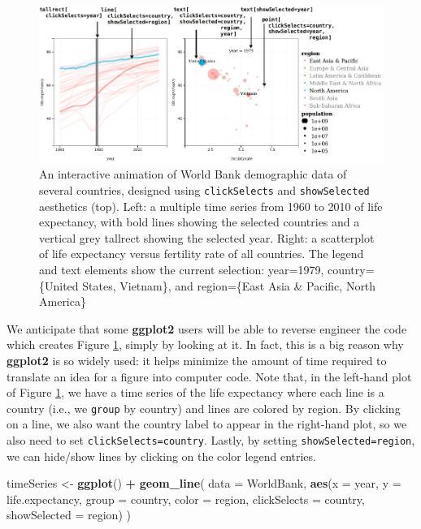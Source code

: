 \documentclass[12pt,]{article}
\newenvironment{Shaded}{\begin{snugshade}}{\end{snugshade}}
\newcommand{\DataTypeTok}[1]{\textcolor[rgb]{0.13,0.29,0.53}{#1}}
\newcommand{\KeywordTok}[1]{\textcolor[rgb]{0.13,0.29,0.53}{\textbf{#1}}}
\newcommand{\NormalTok}[1]{#1}
\newcommand{\OperatorTok}[1]{\textcolor[rgb]{0.81,0.36,0.00}{\textbf{#1}}}
\newcommand{\StringTok}[1]{\textcolor[rgb]{0.31,0.60,0.02}{#1}}
\theoremstyle{definition}
\theoremstyle{definition}
\theoremstyle{definition}
\theoremstyle{remark}
\begin{document}
\begin{figure}
\centering
\includegraphics{images/figure-1}
\caption{\label{fig:worldbank}An interactive animation of World Bank
demographic data of several countries, designed using
\texttt{clickSelects} and \texttt{showSelected} aesthetics (top). Left:
a multiple time series from 1960 to 2010 of life expectancy, with bold
lines showing the selected countries and a vertical grey tallrect
showing the selected year. Right: a scatterplot of life expectancy
versus fertility rate of all countries. The legend and text elements
show the current selection: year=1979, country=\{United States,
Vietnam\}, and region=\{East Asia \& Pacific, North America\}}
\end{figure}

We anticipate that some \textbf{ggplot2} users will be able to reverse
engineer the code which creates Figure \ref{fig:worldbank}, simply by
looking at it. In fact, this is a big reason why \textbf{ggplot2} is so
widely used: it helps minimize the amount of time required to translate
an idea for a figure into computer code. Note that, in the left-hand
plot of Figure \ref{fig:worldbank}, we have a time series of the life
expectancy where each line is a country (i.e., we \texttt{group} by
country) and lines are colored by region. By clicking on a line, we also
want the country label to appear in the right-hand plot, so we also need
to set \texttt{clickSelects=country}. Lastly, by setting
\texttt{showSelected=region}, we can hide/show lines by clicking on the
color legend entries.

\begin{Shaded}
\begin{Highlighting}[]
\NormalTok{timeSeries <-}\StringTok{ }\KeywordTok{ggplot}\NormalTok{() }\OperatorTok{+}\StringTok{ }\KeywordTok{geom_line}\NormalTok{(}
  \DataTypeTok{data =}\NormalTok{ WorldBank,}
  \KeywordTok{aes}\NormalTok{(}\DataTypeTok{x =}\NormalTok{ year, }\DataTypeTok{y =}\NormalTok{ life.expectancy,}
      \DataTypeTok{group =}\NormalTok{ country, }\DataTypeTok{color =}\NormalTok{ region,}
      \DataTypeTok{clickSelects =}\NormalTok{ country, }
      \DataTypeTok{showSelected =}\NormalTok{ region)}
\NormalTok{)}
\end{Highlighting}
\end{Shaded}
\end{document}
